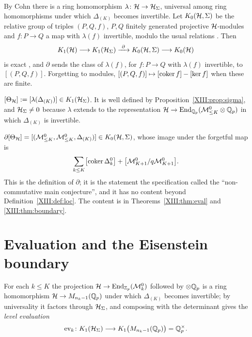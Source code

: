 \begin{definition}\label{XIII:def:loc}
By Cohn \cite{Co} there is a ring homomorphism $\lambda\colon\mathcal{H}\to\mathcal{H}_\Sigma$, universal among ring
homomorphisms under which $\Delta_{(K)}$ becomes invertible. Let $K_0(\mathcal{H},\Sigma)$ be the
relative group of triples $(P,Q,f)$, $P,Q$ finitely generated projective $\mathcal{H}$-modules and
$f\colon P\to Q$ a map with $\lambda(f)$ invertible, modulo the usual relations
\cite[Ch.~4]{Sch}. Then
\begin{equation}\label{XIII:eq:seq}
K_1(\cH)\longrightarrow K_1(\HS)\xrightarrow{\ \partial\ }K_0(\cH,\Sigma)\longrightarrow K_0(\cH)
\end{equation}
is exact \cite[Ch.~4]{Sch}, and $\partial$ sends the class of $\lambda(f)$, for
$f\colon P\to Q$ with $\lambda(f)$ invertible, to $[(P,Q,f)]$. Forgetting to modules,
$[(P,Q,f)]\mapsto[\operatorname{coker} f]-[\ker f]$ when these are finite.
\end{definition}

\begin{definition}\label{XIII:def:theta}
$[\Theta_{\mathcal{H}}]:=[\lambda(\Delta_{(K)})]\in K_1(\mathcal{H}_\Sigma)$. It is well defined by
Proposition~\ref{XIII:prop:sigma}, and $\mathcal{H}_\Sigma\ne0$ because $\lambda$ extends to the representation
$\mathcal{H}\to\operatorname{End}_{\mathbb{Q}_p}(\mathcal{M}^{0}_{\le K}\otimes\mathbb{Q}_p)$ in which $\Delta_{(K)}$ is invertible.
\end{definition}

\begin{theorem}\label{XIII:thm:tauto}
$\partial[\Theta_{\mathcal{H}}]=[(\mathcal{M}^{0}_{\le K},\mathcal{M}^{0}_{\le K},\Delta_{(K)})]\in K_0(\mathcal{H},\Sigma)$, whose
image under the forgetful map is
\[
\sum_{k\le K}\bigl[\operatorname{coker}\Delta_k^{0}\bigr]+\bigl[\mathcal{M}^{0}_{K+1}/q\mathcal{M}^{0}_{K+1}\bigr].
\]
This is the definition of $\partial$; it is the statement the specification called the
``non-commutative main conjecture'', and it has no content beyond
Definition~\ref{XIII:def:loc}. The content is in Theorems~\ref{XIII:thm:eval} and \ref{XIII:thm:boundary}.
\end{theorem}

\section{Evaluation and the Eisenstein boundary}\label{XIII:sec:eval}

For each $k\le K$ the projection $\mathcal{H}\to\operatorname{End}_{\mathbb{Z}_p}(\mathcal{M}^{0}_k)$ followed by
$\otimes\mathbb{Q}_p$ is a ring homomorphism $\mathcal{H}\to M_{n_k-1}(\mathbb{Q}_p)$ under which $\Delta_{(K)}$ becomes
invertible; by universality it factors through $\mathcal{H}_\Sigma$, and composing with the determinant
gives the \emph{level evaluation}
\[
\operatorname{ev}_k\colon K_1(\mathcal{H}_\Sigma)\longrightarrow K_1\bigl(M_{n_k-1}(\mathbb{Q}_p)\bigr)=\mathbb{Q}_p^{\times}.
\]

